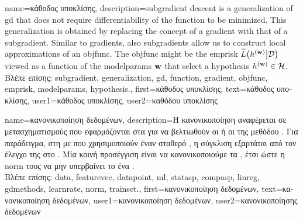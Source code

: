 {name={\foreignlanguage{greek}{κάθοδος υποκλίσης}}, 
	description={\Gls{subgradient} 
		descent is a \gls{generalization} of \gls{gd} that does not require differentiability of the 
		\gls{function} to be minimized. This \gls{generalization} is obtained by replacing the concept 
		of a \gls{gradient} with that of a \gls{subgradient}. Similar to \gls{gradient}s, also \gls{subgradient}s 
		allow us to construct local approximations of an \gls{objfunc}. The \gls{objfunc} 
		might be the \gls{emprisk} $\widehat{L}\big( h^{({\bf w})} \big| \mathcal{D} \big)$ viewed 
		as a \gls{function} of the \gls{modelparams} ${\bf w}$ that select a \gls{hypothesis} $h^{({\bf w})} \in \mathcal{H}$.\\
		\foreignlanguage{greek}{Βλέπε επίσης:} \gls{subgradient}, \gls{generalization}, \gls{gd}, \gls{function}, \gls{gradient}, 
		\gls{objfunc}, \gls{emprisk}, \gls{modelparams}, \gls{hypothesis}.},
	first={\foreignlanguage{greek}{κάθοδος υποκλίσης}},
	text={\foreignlanguage{greek}{κάθοδος υποκλίσης}},
	user1={\foreignlanguage{greek}{κάθοδος υποκλίσης}}, %
	user2={\foreignlanguage{greek}{καθόδου υποκλίσης}} %
}

{name={\foreignlanguage{greek}{κανονικοποίηση δεδομένων}},
	description={\foreignlanguage{greek}{Η κανονικοποίηση}  
		\foreignlanguage{greek}{αναφέρεται σε μετασχηματισμούς που εφαρμόζονται στα}   
		\foreignlanguage{greek}{για να βελτιωθούν οι}  \foreignlanguage{greek}{ή οι}  
		\foreignlanguage{greek}{της μεθόδου} . \foreignlanguage{greek}{Για παράδειγμα, στη}  
		\foreignlanguage{greek}{με}  \foreignlanguage{greek}{που χρησιμοποιούν έναν σταθερό}
		, \foreignlanguage{greek}{η σύγκλιση εξαρτάται από τον έλεγχο της}   
		\foreignlanguage{greek}{στο} . \foreignlanguage{greek}{Μία κοινή προσέγγιση είναι να κανονικοποιούμε τα} 
		, \foreignlanguage{greek}{έτσι ώστε η} 
		\gls{norm} \foreignlanguage{greek}{τους να μην υπερβαίνει το ένα} \cite[\foreignlanguage{greek}{Κεφ.}\ 5]{MLBasics}.\\
		\foreignlanguage{greek}{Βλέπε επίσης:} \gls{data}, \gls{featurevec}, \gls{datapoint}, \gls{ml}, \gls{statasp}, \gls{compasp}, 
		\gls{linreg}, \gls{gdmethods}, \gls{learnrate}, \gls{norm}, \gls{trainset}.},
	first={\foreignlanguage{greek}{κανονικοποίηση δεδομένων}},
	text={\foreignlanguage{greek}{κανονικοποίηση δεδομένων}},
	user1={\foreignlanguage{greek}{κανονικοποίηση δεδομένων}}, %
  	user2={\foreignlanguage{greek}{κανονικοποίησης δεδομένων}} %
}

